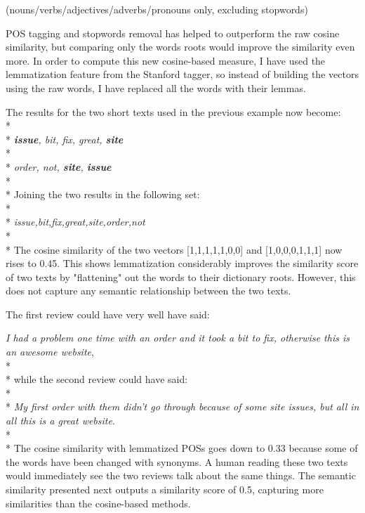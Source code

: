 (nouns/verbs/adjectives/adverbs/pronouns only, excluding stopwords)

POS tagging and stopwords removal has helped to outperform the raw cosine similarity, but comparing only the words roots would improve the similarity even more. In order to compute this new cosine-based measure, I have used the lemmatization feature from the Stanford tagger, so instead of building the vectors using the raw words, I have replaced all the words with their lemmas. 

The results for the two short texts used in the previous example now become:
\\*
\\*
\textit{\textbf{issue}, bit, fix, great, \textbf{site}}
\\*
\\*
\textit{order, not, \textbf{site}, \textbf{issue}}
\\*
\\*
Joining the two results in the following set:
\\*
\\*
\textit{issue,bit,fix,great,site,order,not}
\\*
\\*
The cosine similarity of the two vectors [1,1,1,1,1,0,0] and [1,0,0,0,1,1,1] now rises to 0.45. 
This shows lemmatization considerably improves the similarity score of two texts by "flattening" out the words to their dictionary roots. However, this does not capture any semantic relationship between the two texts. 

The first review could have very well have said:

\clearpage

\textit{I had a problem one time with an order and it took a bit to fix, otherwise this is an awesome website}, 
\\*
\\*
while the second review could have said: 
\\*
\\*
\textit{My first order with them didn't go through because of some site issues, but all in all this is a great website}.
\\*
\\* 
The cosine similarity with lemmatized POSs goes down to 0.33 because some of the words have been changed with synonyms. A human reading these two texts would immediately see the two reviews talk about the same things. The semantic similarity presented next outputs a similarity score of 0.5, capturing more similarities than the cosine-based methods.

